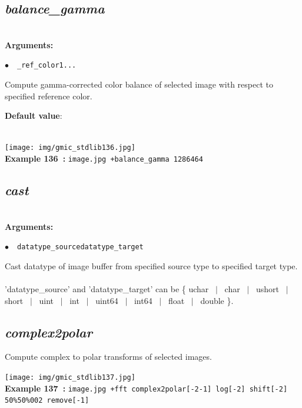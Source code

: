 \documentclass[a4paper,10.5pt,twoside]{book}
\def\comma{\discretionary{,}{}{,}}
\newcommand{\Cb}[1]{\textcolor{cb}{#1}}
\newcommand{\Cc}[1]{\textcolor{cc}{#1}}
\begin{document}
\subsection{\emph{balance\_gamma} }\vspace*{-0.7em}
~\\\textbf{\Cb{Arguments: }}\begin{flushleft}
{\small \Cb{\hspace*{0.5cm}$\bullet$~~\texttt{\_ref\_color1{\comma}...}}}\end{flushleft}
Compute gamma-corrected color balance of selected image{\comma} with respect to specified reference color.
\begin{flushleft}\Cc{\textbf{Default value}:\\~\\\hspace*{0.5cm}{\small $\bullet$~~\texttt{'ref\_color1=128'.}}}\end{flushleft}
\begin{center}\texttt{[image: img/gmic\_stdlib136.jpg]}\\
{\footnotesize \textbf{Example 136~:} \texttt{image.jpg +balance\_gamma 128{\comma}64{\comma}64}}
\end{center}

\subsection{\emph{cast} }\vspace*{-0.7em}
~\\\textbf{\Cb{Arguments: }}\begin{flushleft}
{\small \Cb{\hspace*{0.5cm}$\bullet$~~\texttt{datatype\_source{\comma}datatype\_target}}}\end{flushleft}
Cast datatype of image buffer from specified source type to specified target type.
~\\'datatype\_source' and 'datatype\_target' can be \{ uchar ~$|$~ char ~$|$~ ushort ~$|$~ short ~$|$~ uint ~$|$~ int ~$|$~ uint64 ~$|$~ int64 ~$|$~ float ~$|$~ double \}.


\subsection{\emph{complex2polar} }\vspace*{-0.7em}
Compute complex to polar transforms of selected images.
\begin{center}\texttt{[image: img/gmic\_stdlib137.jpg]}\\
{\footnotesize \textbf{Example 137~:} \texttt{image.jpg +fft complex2polar[-2{\comma}-1] log[-2] shift[-2] 50\%{\comma}50\%{\comma}0{\comma}0{\comma}2 remove[-1]}}
\end{center}
\end{document}
